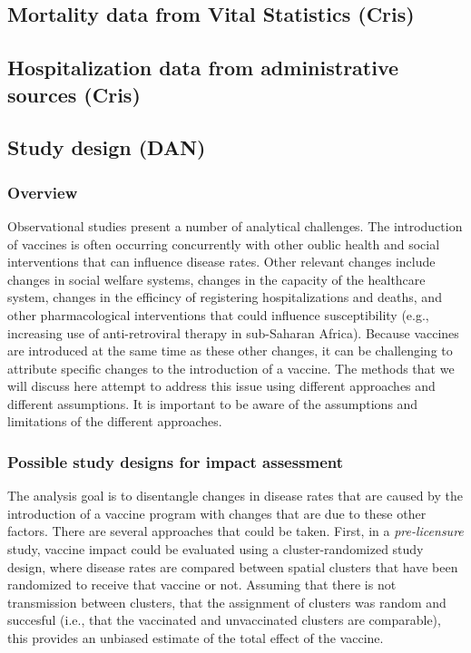\documentclass[]{article}
\begin{document}
\subsection{Mortality data from Vital Statistics
(Cris)}\label{mortality-data-from-vital-statistics-cris}

\subsection{Hospitalization data from administrative sources
(Cris)}\label{hospitalization-data-from-administrative-sources-cris}

\subsection{Study design (DAN)}\label{study-design-dan}

\subsubsection{Overview}\label{overview}

Observational studies present a number of analytical challenges. The
introduction of vaccines is often occurring concurrently with other
oublic health and social interventions that can influence disease rates.
Other relevant changes include changes in social welfare systems,
changes in the capacity of the healthcare system, changes in the
efficincy of registering hospitalizations and deaths, and other
pharmacological interventions that could influence susceptibility (e.g.,
increasing use of anti-retroviral therapy in sub-Saharan Africa).
Because vaccines are introduced at the same time as these other changes,
it can be challenging to attribute specific changes to the introduction
of a vaccine. The methods that we will discuss here attempt to address
this issue using different approaches and different assumptions. It is
important to be aware of the assumptions and limitations of the
different approaches.

\subsubsection{Possible study designs for impact
assessment}\label{possible-study-designs-for-impact-assessment}

The analysis goal is to disentangle changes in disease rates that are
caused by the introduction of a vaccine program with changes that are
due to these other factors. There are several approaches that could be
taken. First, in a \emph{pre-licensure} study, vaccine impact could be
evaluated using a cluster-randomized study design, where disease rates
are compared between spatial clusters that have been randomized to
receive that vaccine or not. Assuming that there is not transmission
between clusters, that the assignment of clusters was random and
succesful (i.e., that the vaccinated and unvaccinated clusters are
comparable), this provides an unbiased estimate of the total effect of
the vaccine.
\end{document}
